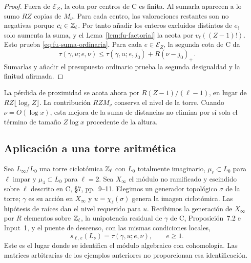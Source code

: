 \begin{proof}
Fuera de $\mathcal E_Z$, la cota por centros de C es finita.
Al sumarla aparecen a lo sumo $RZ$ copias de $M_\nu$.
Para cada centro, las valoraciones restantes son no negativas
porque $c_i\in\mathbb{Z}_\ell$. Por tanto añadir los enteros
excluidos distintos de $e_i$ solo aumenta la suma, y
el Lema~\ref{lem:fu-factorial} la acota por
$v_\ell((Z-1)!)$. Esto prueba \eqref{eq:fu-suma-ordinaria}.
Para cada $e\in\mathcal E_Z$, la segunda cota de C da
\[
 \tau(\gamma,u;e,\nu)
 \le\tau(\gamma,u;e,j_0)+R(\nu-j_0)_+.
\]
Sumarlas y añadir el presupuesto ordinario prueba la segunda
desigualdad y la finitud afirmada.
\end{proof}

La pérdida de proximidad se acota ahora por
$R(Z-1)/(\ell-1)$, en lugar de
$RZ\lfloor\log_\ell Z\rfloor$.
La contribución $RZM_\nu$ conserva el nivel de la torre.
Cuando $\nu=O(\log x)$, esta mejora de la suma de distancias
no elimina por sí sola el término de tamaño $Z\log x$
procedente de la altura.

\subsection{Aplicación a una torre aritmética}

Sea $L_\infty/L_0$ una torre ciclotómica $\mathbb{Z}_\ell$ con
$L_0$ totalmente imaginario, $\mu_\ell\subset L_0$ para
$\ell$ impar y $\mu_4\subset L_0$ para $\ell=2$.
Sea $X_\infty$ el módulo no ramificado y escindido sobre
$\ell$ descrito en C, §7, pp.~9--11.
Elegimos un generador topológico $\sigma$ de la torre;
$\gamma$ es su acción en $X_\infty$ y
$u=\chi_\ell(\sigma)$ genera la imagen ciclotómica.
Las hipótesis de raíces dan el nivel requerido para $u$.
Recibimos la generación de $X_\infty$ por $R$ elementos
sobre $\mathbb{Z}_\ell$, la unipotencia residual de $\gamma$
de C, Proposición~7.2 e Input~1, y el puente de descenso,
con las mismas condiciones locales,
\begin{equation}
 s_{\ell,e}(L_\nu)=\tau(\gamma,u;e,\nu),\qquad e\ge1.
 \label{eq:fu-puente-torre}
\end{equation}
Este es el lugar donde se identifica el módulo algebraico con
cohomología. Las matrices arbitrarias de los ejemplos anteriores
no proporcionan esa identificación.

